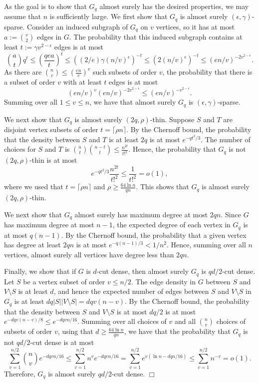 \documentclass[11pt]{article}
\newenvironment{proof}
      {\medskip\noindent{\bf Proof:}\hspace{1mm}}
      {\hfill$\Box$\medskip}
\begin{document}
\begin{proof}
As the goal is to show that $G_q$ almost surely has the desired properties, we may assume that $n$ is sufficiently large. We first show that $G_q$ is almost surely $(\epsilon,\gamma)$-sparse. Consider an induced subgraph of $G_q$ on $v$ vertices, so it has at most $a:={v \choose 2}$ edges in $G$. The probability that this induced subgraph contains at least $t:=\gamma v^{2-\epsilon}$ edges is at most $${a \choose t}q^{t} \leq \left(\frac{qea}{t}\right)^{t} \leq \left((2/e)\gamma (n/v)^{\epsilon}\right)^{-t} \leq \left(2 (n/v)^{\epsilon}\right)^{-t} \leq (en/v)^{-2v^{2-\epsilon}}.$$
As there are ${n \choose v} \leq \left(\frac{en}{v}\right)^v$ such subsets of order $v$, the probability that there is a subset of order $v$ with at least $t$ edges is at most $$ \left(en/v\right)^v  \left(en/v\right)^{-2 v^{2-\epsilon}} \leq  \left(en/v\right)^{-v^{2-\epsilon}} .$$
Summing over all $1 \leq v \leq n$, we have that almost surely $G_q$ is $(\epsilon,\gamma)$-sparse.

We next show that $G_q$ is almost surely $(2q,\rho)$-thin. Suppose $S$ and $T$ are disjoint vertex subsets of order $t= \lceil \rho n \rceil $. By the Chernoff bound, the probability that the density between $S$ and $T$ is at least $2q$ is at most $e^{-qt^2/3}$. The number of choices for $S$ and $T$ is ${n \choose t}{n-t \choose t} \leq \frac{n^{2t}}{t!^2}$. Hence, the probability that $G_q$ is not $(2q,\rho)$-thin is at most 
$$e^{-qt^2 /3}\frac{n^{2t}}{t!^2} \leq \frac{1}{t!^2}=o(1),$$
where we used that  $t= \lceil \rho n \rceil$ and $\rho \geq \frac{64\ln n}{qn}$. This
shows that $G_q$ is almost surely $(2q,\rho)$-thin.

We next show that $G_q$ almost surely has maximum degree at most $2qn$. Since $G$ has maximum degree at most $n-1$, the expected degree of each vertex in $G_q$ is at most $q(n-1)$. By the Chernoff bound, the probability that a given vertex has degree at least $2qn$ is at most $e^{-q(n-1)/3}<1/n^2$. Hence, summing over all $n$ vertices, almost surely all vertices have degree less than $2qn$.

Finally, we show that if $G$ is $d$-cut dense, then almost surely $G_q$ is $qd/2$-cut dense.  Let $S$ be a vertex subset of order $v \leq n/2$. The edge density in $G$ between $S$ and $V \setminus S$ is at least $d$, and hence the expected number of edges between $S$ and $V \setminus S$ in $G_q$ is at least $dq|S||V \setminus S| = dqv(n-v)$. By the Chernoff bound, the probability that the density between $S$ and $V \setminus S$ is at most $dq/2$ is at most $e^{-dqv(n-v)/8} \leq e^{-dqvn/16}$. Summing over all choices of $v$ and all ${n \choose v}$ choices of subsets of order $v$,
using that $d \geq \frac{64\ln n}{qn}$, we have that the probability that $G_q$ is not $qd/2$-cut dense is at most
$$\sum_{v=1}^{n/2} {n \choose v}e^{-dqvn/16} \leq \sum_{v=1}^{n/2} n^v e^{-dqvn/16}= \sum_{v=1}^{n/2} e^{v(\ln n - dqn/16)} \leq \sum_{v=1}^{n/2}n^{-v}=o(1).$$
Therefore, $G_q$ is almost surely $qd/2$-cut dense.
\end{proof}
\end{document}
